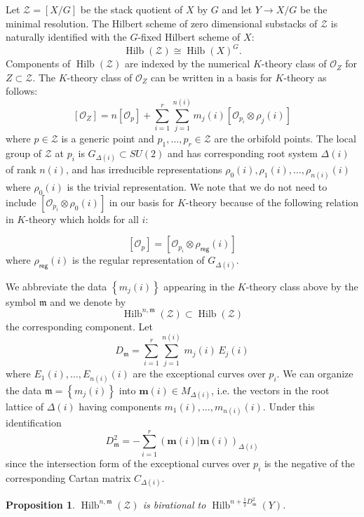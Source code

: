\documentclass{amsart}
\newtheorem{proposition}[theorem]{Proposition}
\theoremstyle{definition}
\newcommand{\half}{\frac{1}{2}}
\newcommand{\reg}{\mathsf{reg}}
\newcommand{\mdata}{\mathfrak{m}}
\renewcommand{\O}{\mathcal{O}}
\newcommand{\Zcal}{\mathcal{Z}}
\newcommand{\mvec}{\bm{m}}
\newcommand{\Hilb}{\operatorname{Hilb}}
\begin{document}
Let $\Zcal  =[X/G]$ be the stack quotient of $X$ by $G$ and let $Y\to
X/G$ be the minimal resolution. %
The Hilbert scheme of zero dimensional substacks of $\Zcal$ is
naturally identified with the $G$-fixed Hilbert scheme of $X$:
\[
\Hilb (\Zcal )\cong \Hilb (X)^{G}.
\]
Components of $\Hilb (\Zcal )$ are indexed by the numerical $K$-theory
class of $\O_{Z}$ for $Z\subset \Zcal$. The $K$-theory class of
$\O_{Z}$ can be written in a basis for $K$-theory as follows:
\[
[\O_{Z}] = n[\O_{p}] + \sum_{i=1}^{r} \sum_{j=1}^{n(i)}
m_{j}(i)[\O_{p_{i}}\otimes \rho_{j}(i)] 
\]
where $p\in \Zcal$ is a generic point and $p_{1},\dotsc ,p_{r}\in \Zcal$
are the orbifold points. The local group of $\Zcal$ at $p_{i}$ is
$G_{\Delta (i)}\subset SU(2)$  and has corresponding root system
$\Delta (i)$ of rank $n(i)$, and has irreducible representations
$\rho_{0}(i),\rho_{1}(i),\dotsc ,\rho_{n(i)}(i)$ where $\rho_{0}(i)$
is the trivial representation. 
We note that we do not need to include $ [\O_{p_{i}}\otimes
\rho_{0}(i)]$ in our basis for $K$-theory because of the following
relation in  $K$-theory which holds for all $i$:

\begin{equation}\label{eqn: Op = O0timesrhoreg}
[\O_{p}] = [\O_{p_{i}}\otimes \rho_{\reg}(i)]
\end{equation}
where $\rho_{\reg}(i)$ is the regular representation of
$G_{\Delta(i)}$.


We abbreviate the data $\left\{m_{j}(i) \right\}$ appearing in the
$K$-theory class above by the symbol $\mdata$ and we denote by
\[
\Hilb^{n,\mdata}(\Zcal ) \subset \Hilb (\Zcal )
\]
the corresponding component. Let
\[
D_{\mdata} = \sum_{i=1}^{r} \sum_{j=1}^{n(i)} \, m_{j}(i)\, E_{j}(i)
\]
where
$E_{1}(i),\dotsc ,E_{n(i)}(i)$ are
the exceptional curves over $p_{i}$. We can organize the data $\mdata = \left\{m_{j}(i) \right\}$ into
$\mvec (i)\in M_{\Delta (i)}$, i.e.  the vectors in the root lattice
of $\Delta (i)$ having components $ m_{1}(i),\dotsc
,m_{n(i)}(i)$. Under this identification
\[
D_{\mdata}^{2} = -\sum_{i=1}^{r} \left(\mvec (i)|\mvec (i)
\right)_{\Delta (i)} 
\]
since the intersection form of the exceptional curves over $p_{i}$ is
the negative of the corresponding Cartan matrix $C_{\Delta (i)}$. 


\begin{proposition}\label{prop: Hilb(Z) is birational to Hilb(Y)}
	$\Hilb^{n,\mdata}(\Zcal)$ is birational to $\Hilb^{n+\half
		D_{\mdata}^{2}}(Y)$. 
\end{proposition}
\end{document}
